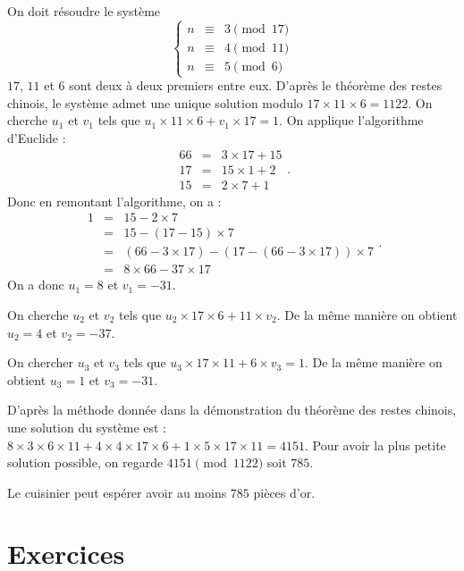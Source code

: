\documentclass[10pt,a4paper]{article}
\begin{document}
\begin{itemize}
On doit résoudre le système
$$\left\lbrace
\begin{array}{rcl}
n &\equiv& 3 \pmod{17} \\
n &\equiv& 4 \pmod{11} \\
n &\equiv& 5 \pmod{6}
\end{array}\right.$$
 $17$, $11$ et $6$ sont deux à deux premiers entre eux. D'après le théorème des restes chinois, le système admet une unique solution modulo $17\times 11\times 6=1122$.
On cherche $u_1$ et $v_1$ tels que $u_1\times 11\times 6 + v_1\times 17 = 1$. On applique l'algorithme d'Euclide :
$$\begin{array}{ccl}
66 & = & 3\times 17+15 \\
17 & = & 15\times 1 + 2 \\
15 &=& 2\times 7+1
\end{array}.$$
Donc en remontant l'algorithme, on a :
$$\begin{array}{ccl}
1&=& 15-2\times 7 \\
&=& 15- (17-15)\times 7 \\
&=& (66-3\times 17)-(17-(66-3\times 17))\times 7 \\
&=& 8\times 66 - 37\times 17
\end{array}.$$
On a donc $u_1=8$ et $v_1=-31$.

On cherche $u_2$ et $v_2$ tels que $u_2\times 17 \times 6+11\times v_2$. De la même manière on obtient $u_2=4$ et $v_2=-37$.

On chercher $u_3$ et $v_3$ tels que $u_3\times 17\times 11 + 6\times v_3=1$. De la même manière on obtient $u_3=1$ et $v_3=-31$.

D'après la méthode donnée dans la démonstration du théorème des restes chinois, une solution du système est : $8\times 3 \times 6 \times 11+ 4\times 4 \times
17 \times 6+1\times 5 \times 17\times 11=4151$. Pour avoir la plus petite solution possible, on regarde $4151 \pmod{1122}$ soit $785$.

Le cuisinier peut espérer avoir au moins $785$ pièces d'or.

\end{itemize}

\section{Exercices}
\end{document}
